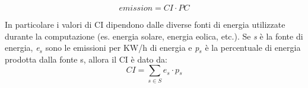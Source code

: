 \begin{equation*}
    \textit{emission} = \textit{CI}  \cdot \textit{PC}
\end{equation*}

\noindent In particolare i valori di CI dipendono dalle diverse fonti di energia utilizzate durante la computazione 
(es. energia solare, energia eolica, etc.). Se \textit{s} è la fonte di energia,  \textit{e$_s$} sono le emissioni per KW/h di energia e \textit{p$_s$}  è la percentuale di energia prodotta dalla fonte s, allora il CI è dato da:
\begin{equation*}
    \textit{CI} = \sum_{s \in S} \textit{e$_s$} \cdot \textit{p$_s$}
\end{equation*}


